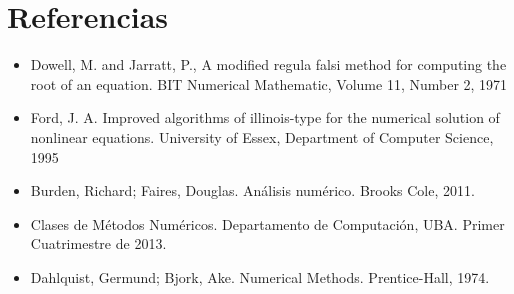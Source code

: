 \section{Referencias}

\begin{itemize}

  \item \nocite {Dowell} Dowell, M. and Jarratt, P., A modified regula falsi method for computing the root of an equation.
      BIT Numerical Mathematic, Volume 11, Number 2, 1971
  \item \nocite {Ford} Ford, J. A. Improved algorithms of illinois-type for the numerical solution of nonlinear equations. 
      University of Essex, Department of Computer Science, 1995
  \item \nocite {Burden} Burden, Richard; Faires, Douglas. An\'alisis 
num\'erico. Brooks Cole, 2011.
  \item \nocite {MN} Clases de M\'etodos Num\'ericos. Departamento de 
Computaci\'on, UBA. Primer Cuatrimestre de 2013.
  \item \nocite {Dahlquist} Dahlquist, Germund; Bjork, Ake. Numerical Methods. 
Prentice-Hall, 1974.
\end{itemize}
